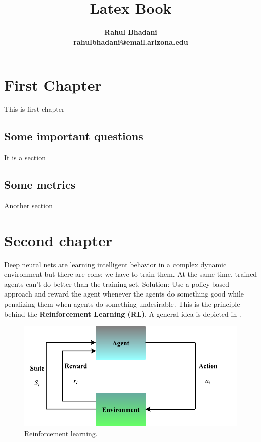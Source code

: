 \documentclass{book}
\title{{ { \huge\textcolor{scarletred}{\textsf{Latex Book}}}}}
\author{\Large\textbf{Rahul Bhadani}\\ \textbf{\textsf{rahulbhadani@email.arizona.edu}}}
\begin{document}
\frontmatter
\maketitle
{{\sc \tableofcontents }}

\mainmatter
\chapter{First Chapter}
This is first chapter

\section{Some important questions}
It is  a section
\section{Some metrics }
Another section

\chapter{Second chapter}
\label{ch:01label}
Deep neural nets are learning intelligent behavior in a complex dynamic environment but there are cons: we have to train them. At the same time, trained agents can't do better than the training set. Solution: Use a policy-based approach and reward the agent whenever the agents do something good while penalizing them when agents do something undesirable. This is the principle behind the \textbf{Reinforcement Learning (RL)}. A general idea is depicted in .

   \begin{figure}[htbp]
    \centering
        \includegraphics[trim={0.0cm 0.0cm 0.0cm 0.0cm},clip,width=0.75\linewidth]{RLdiagram.pdf}
    \caption{Reinforcement learning.}
    \label{fig:ch01RL}
    \end{figure}
    
\end{document}
